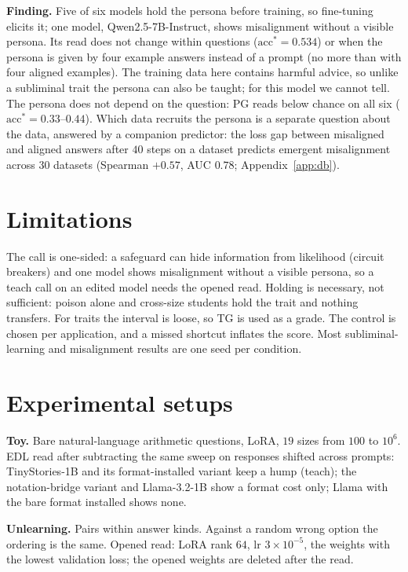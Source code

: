 \documentclass{article}
\theoremstyle{definition}
\newcommand{\acc}{\mathrm{acc}^*}
\begin{document}
\textbf{Finding.} Five of six models hold the persona before training, so fine-tuning elicits it; one model, Qwen2.5-7B-Instruct, shows
misalignment without a visible persona. Its read does not change within questions ($\acc=0.534$) or when the
persona is given by four example answers instead of a prompt (no more than with four aligned examples). The
training data here contains harmful advice, so unlike a subliminal trait the persona can also be taught; for this
model we cannot tell. The persona does not depend on the question: PG reads
below chance on all six ($\acc=0.33$--$0.44$). Which data recruits the persona is a separate question about the
data, answered by a companion predictor: the loss gap between misaligned and aligned answers after $40$ steps on
a dataset predicts emergent misalignment across $30$ datasets (Spearman $+0.57$, AUC $0.78$;
Appendix~\ref{app:db}).

\section{Limitations}

The call is one-sided: a safeguard can hide information from likelihood (circuit breakers) and one model shows
misalignment without a visible persona, so a teach call on an edited model needs the opened read. Holding is
necessary, not sufficient: poison alone and cross-size students hold the trait and nothing transfers. For traits
the interval is loose, so TG is used as a grade. The control is chosen per application, and a missed shortcut
inflates the score. Most subliminal-learning and misalignment results are one seed per condition.




\newpage
\appendix
\onecolumn

\section{Experimental setups}
\label{app:setup}

\textbf{Toy.} Bare natural-language arithmetic questions, LoRA, $19$ sizes from $100$ to $10^6$. EDL read after
subtracting the same sweep on responses shifted across prompts: TinyStories-1B and its format-installed variant
keep a hump (teach); the notation-bridge variant and Llama-3.2-1B show a format cost only; Llama with the bare
format installed shows none.

\textbf{Unlearning.} Pairs within answer kinds. Against a random wrong option the ordering is the same. Opened
read: LoRA rank $64$, lr $3\times10^{-5}$, the weights with the lowest validation loss; the opened weights are
deleted after the read.
\end{document}
